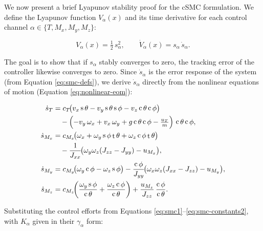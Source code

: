 \documentclass[conf]{new-aiaa}
\DeclareMathOperator{\s}{s}
\DeclareMathOperator{\cs}{c}
\DeclareMathOperator{\tn}{t}
\begin{document}
We now present a brief Lyapunov stability proof for the cSMC formulation. We define the Lyapunov function $V_\alpha(x)$ and its time derivative for each control channel $\alpha \in \{T, M_x, M_y, M_z\}$:

\small
\begin{equation}
\label{eq:lyapunov}
V_\alpha(x) = \tfrac{1}{2}\, s_\alpha^2, \qquad
\dot V_\alpha(x) = s_\alpha\, \dot s_\alpha.
\end{equation}
\normalsize

The goal is to show that if $s_\alpha$ stably converges to zero, the tracking error of the controller likewise converges to zero. Since $\dot{s}_\alpha$ is the error response of the system (from Equation \ref{eq:smc-defs}), we derive $\dot s_\alpha$ directly from the nonlinear equations of motion (Equation \ref{eq:nonlinear-eom}):

\small
\begingroup
\setlength{\jot}{1pt}
\begin{equation}
\label{eq:sdot-from-eom}
\begin{aligned}
\dot s_T
&= c_T\!\bigl(
v_x \s\theta - v_y \s\theta \s\phi - v_z \cs\theta \cs\phi
\bigr) \\
&\quad - \Bigl(
-v_y \,\omega_x + v_x \,\omega_y + g \cs\theta \cs\phi - \tfrac{u_T}{m}
\Bigr)\, \cs\theta \cs\phi,
\\
\dot s_{M_x}
&= c_{M_x} \!\bigl(
\omega_x + \omega_y \s\phi \tn\theta + \omega_z \cs\phi \tn\theta
\bigr) \\
&\quad - \frac{1}{J_{xx}}\!\bigl(
\omega_y \omega_z (J_{zz} - J_{yy}) - u_{M_x}
\bigr),
\\
\dot s_{M_y}
&= c_{M_y} \!\bigl(
\omega_y \cs\phi - \omega_z \s\phi
\bigr) - \frac{\cs\phi}{J_{yy}}\!\bigl(
\omega_x \omega_z (J_{xx} - J_{zz}) - u_{M_y}
\bigr),
\\
\dot s_{M_z}
&= c_{M_z} \!\biggl(
\frac{\omega_y \s\phi}{\cs\theta} + \frac{\omega_z \cs\phi}{\cs\theta}
\biggr) + \frac{u_{M_z}}{J_{zz}}\, \frac{\cs\phi}{\cs\theta}.
\end{aligned}
\end{equation}
\endgroup
\normalsize

Substituting the control efforts from Equations \ref{eq:smc1}–\ref{eq:smc-constants2}, with $K_\alpha$ given in their $\gamma_\alpha$ form:
\end{document}
